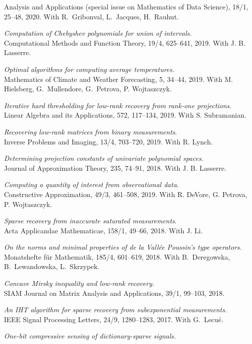 \documentclass[11pt]{article}
\begin{document}
Analysis and Applications (special issue on Mathematics of Data Science), 18/1, 25--48, 2020.
With R.~Gribonval, L.~Jacques, H.~Rauhut.
\item {\sl Computation of Chebyshev polynomials for union of intervals.}\\
Computational Methods and Function Theory, 19/4, 625--641, 2019.
With J. B. Lasserre.
\item {\sl Optimal algorithms for computing average temperatures.}\\
Mathematics of Climate and Weather Forecasting, 5, 34--44, 2019.
With M. Hielsberg, G.~Mullendore, G.~Petrova, P. Wojtaszczyk.
\item {\sl Iterative hard thresholding for low-rank recovery from rank-one projections}.\\
Linear Algebra and its Applications, 572, 117--134, 2019. With S. Subramanian.
\item {\sl Recovering low-rank matrices from binary measurements}.\\
Inverse Problems and Imaging, 13/4, 703--720, 2019. 
With R. Lynch. 
\item {\sl Determining projection constants of univariate polynomial spaces}.\\
Journal of Approximation Theory, 235, 74--91, 2018.
With J. B. Lasserre.
\item {\sl Computing a quantity of interest from observational data}.\\
Constructive Approximation, 49/3, 461--508, 2019. With R. DeVore, G. Petrova, P. Wojtaszczyk.
\item {\sl Sparse recovery from inaccurate saturated measurements}.\\
Acta Applicandae Mathematicae, 158/1, 49--66, 2018. With J. Li.
\item {\sl On the norms and minimal properties of de la Vall\'ee Poussin's type operators}.\\
Monatshefte f\"ur Mathematik, 185/4, 601--619, 2018. With B.~Deregowska, B.~Lewandowska, L.~Skrzypek.
\item {\sl Concave Mirsky inequality and low-rank recovery.}\\
SIAM Journal on Matrix Analysis and Applications, 39/1, 99--103, 2018.
\item {\sl An IHT algorithm for sparse recovery from subexponential measurements}.\\
IEEE Signal Processing Letters, 24/9, 1280--1283, 2017. 
With G.~Lecu\'e.
\item {\sl One-bit compressive sensing of dictionary-sparse signals.}\\
\end{document}
